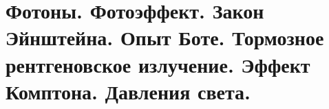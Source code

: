 \chapter{Фотоны. Фотоэффект. Закон Эйнштейна. Опыт Боте. Тормозное 
рентгеновское излучение. Эффект Комптона. Давления света.}

\newpage
